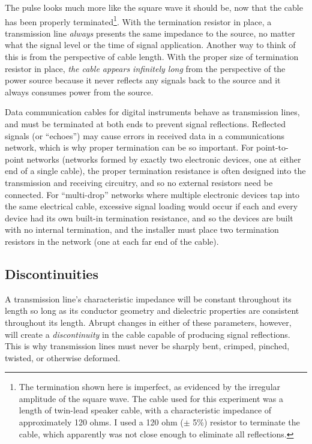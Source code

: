 The pulse looks much more like the square wave it should be, now that the cable has been properly terminated\footnote{The termination shown here is imperfect, as evidenced by the irregular amplitude of the square wave.  The cable used for this experiment was a length of twin-lead speaker cable, with a characteristic impedance of approximately 120 ohms.  I used a 120 ohm ($\pm$ 5\%) resistor to terminate the cable, which apparently was not close enough to eliminate all reflections.}.  With the termination resistor in place, a transmission line \textit{always} presents the same impedance to the source, no matter what the signal level or the time of signal application.  Another way to think of this is from the perspective of cable length.  With the proper size of termination resistor in place, \textit{the cable appears infinitely long} from the perspective of the power source because it never reflects any signals back to the source and it always consumes power from the source.

\vskip 10pt

Data communication cables for digital instruments behave as transmission lines, and must be terminated at both ends to prevent signal reflections.  Reflected signals (or ``echoes'') may cause errors in received data in a communications network, which is why proper termination can be so important.  For point-to-point networks (networks formed by exactly two electronic devices, one at either end of a single cable), the proper termination resistance is often designed into the transmission and receiving circuitry, and so no external resistors need be connected.  For ``multi-drop'' networks where multiple electronic devices tap into the same electrical cable, excessive signal loading would occur if each and every device had its own built-in termination resistance, and so the devices are built with no internal termination, and the installer must place two termination resistors in the network (one at each far end of the cable).







\filbreak
\subsection{Discontinuities}

A transmission line's characteristic impedance will be constant throughout its length so long as its conductor geometry and dielectric properties are consistent throughout its length.  Abrupt changes in either of these parameters, however, will create a \textit{discontinuity} in the cable capable of producing signal reflections.  This is why transmission lines must never be sharply bent, crimped, pinched, twisted, or otherwise deformed.

